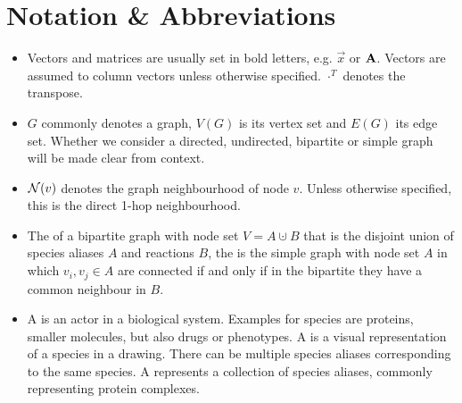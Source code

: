 \documentclass[
	fontsize=10pt, %
	twoside=false, %
	secnumdepth=1, %
]{kaobook}
\begin{document}

\section{Notation \& Abbreviations  }
\begin{itemize}
\item Vectors and matrices are usually set in bold letters, e.g. $\vec x$ or
  $\mathbf{A}$. Vectors are assumed to column vectors unless otherwise specified.
  $\cdot^T$ denotes the transpose.
\item $G$ commonly denotes a graph, $V(G)$ is its vertex set and $E(G)$ its edge
  set. Whether we consider a directed, undirected, bipartite or simple graph
  will be made clear from context.
\item $\mathcal{N}(v)$ denotes the graph neighbourhood of node $v$. Unless otherwise
  specified, this is the direct 1-hop neighbourhood.
\item The  of a bipartite graph with node set $V = A
  \cupdot B$ that is the disjoint union of species aliases $A$ and reactions
  $B$, the  is the simple graph with node set
  $A$ in which $v_i, v_j \in A$ are connected if and only if in the bipartite
  they have a common neighbour in $B$.
\item A  is an actor in a biological system. Examples for species
  are proteins, smaller molecules, but also drugs or phenotypes. A  is a visual representation of a species in a drawing. There can be
  multiple species aliases corresponding to the same species. A  represents a collection of species aliases, commonly
  representing protein complexes.
\end{itemize}





\backmatter %

\end{document}
